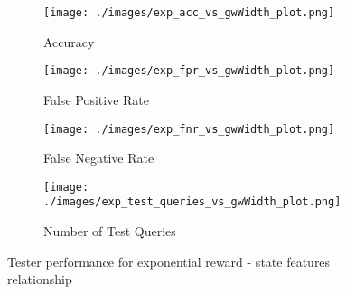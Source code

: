 \begin{figure}[!ht]
     \centering
     \begin{subfigure}[!ht]{0.4\textwidth}
         \centering
         \texttt{[image: ./images/exp\_acc\_vs\_gwWidth\_plot.png]}
         \caption{Accuracy}
         \label{fig:exp_acc_vs_features_plot_appendix_appendix}
     \end{subfigure}
    \hspace{5mm}
     \begin{subfigure}[!ht]{0.4\textwidth}
         \centering
         \texttt{[image: ./images/exp\_fpr\_vs\_gwWidth\_plot.png]}
         \caption{False Positive Rate}
         \label{fig:exp_fpr_vs_features_plot}
     \end{subfigure}
     \hspace{5mm}
     \begin{subfigure}[!ht]{0.4\textwidth}
         \centering
         \texttt{[image: ./images/exp\_fnr\_vs\_gwWidth\_plot.png]}
         \caption{False Negative Rate}
         \label{fig:exp_fnr_vs_features_plot}
     \end{subfigure}
     \hspace{5mm}
    \begin{subfigure}[!ht]{0.4\textwidth}
         \centering
         \texttt{[image: ./images/exp\_test\_queries\_vs\_gwWidth\_plot.png]}
         \caption{Number of Test Queries}
         \label{fig:exp_test_queries_vs_features_plot}
     \end{subfigure}
    \caption{Tester performance for exponential reward - state features relationship}
    \label{fig:exp_experiments}
\end{figure}

